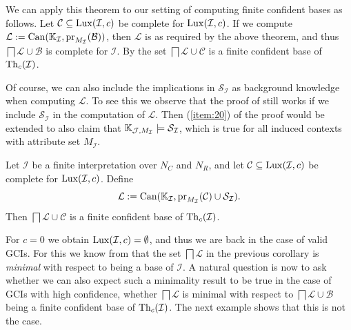We can apply this theorem to our setting of computing finite confident bases as follows.
Let $\mathcal{C} \subseteq \operatorname{Lux}(\mathcal{I}, c)$ be complete for $\operatorname{Lux}(\mathcal{I}, c)$.
If we compute $\mathcal{L} := \operatorname{Can}({\mathbb{K}}_{\mathcal{I}},
\operatorname{pr}_{M_{\mathcal{I}}}(\mathcal{B}))$, then $\mathcal{L}$ is as required by the above
theorem, and thus $\bigsqcap \mathcal{L} \cup \mathcal{B}$ is complete for $\mathcal{I}$.
By  the set $\bigsqcap \mathcal{L} \cup
\mathcal{C}$ is a finite confident base of $\operatorname{Th}_c(\mathcal{I})$.

Of course, we can also include the implications in $\mathcal{S}_{\mathcal{I}}$ as
background knowledge when computing $\mathcal{L}$.  To see this we observe that the proof
of  still works if we include
$\mathcal{S}_{\mathcal{I}}$ in the computation of $\mathcal{L}$.  Then (\ref{item:20}) of
the proof would be extended to also claim that ${\mathbb{K}}_{\mathcal{J}, M_{\mathcal{I}}}
\models \mathcal{S}_{\mathcal{I}}$, which is true for all induced contexts with attribute
set $M_{\mathcal{I}}$.

\begin{Corollary}
  \label{cor:gci-completion-with-S_I}
  Let $\mathcal{I}$ be a finite interpretation over $N_C$ and $N_R$, and let $\mathcal{C}
  \subseteq \operatorname{Lux}(\mathcal{I}, c)$ be complete for $\operatorname{Lux}(\mathcal{I}, c)$.  Define
  \begin{equation*}
    \mathcal{L} := \operatorname{Can}({\mathbb{K}}_{\mathcal{I}}, \operatorname{pr}_{M_{\mathcal{I}}}(\mathcal{C}) \cup \mathcal{S}_{\mathcal{I}}).
  \end{equation*}
  Then $\bigsqcap \mathcal{L} \cup \mathcal{C}$ is a finite confident base of
  $\operatorname{Th}_c(\mathcal{I})$.
\end{Corollary}

For $c = 0$ we obtain $\operatorname{Lux}(\mathcal{I}, c) = \emptyset$, and thus we are back in the case
of valid GCIs.  For this we know from  that the set $\bigsqcap
\mathcal{L}$ in the previous corollary is \emph{minimal} with respect to being a base of
$\mathcal{I}$.  A natural question is now to ask whether we can also expect such a
minimality result to be true in the case of GCIs with high confidence, \ie whether
$\bigsqcap \mathcal{L}$ is minimal with respect to $\bigsqcap \mathcal{L} \cup
\mathcal{B}$ being a finite confident base of $\operatorname{Th}_c(\mathcal{I})$.  The next example
shows that this is not the case.

